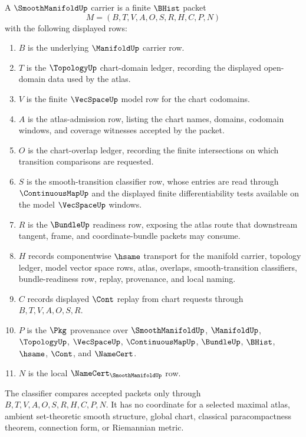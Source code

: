 \begin{definition}
\label{def:smoothmanifold-carrier}
A $\SmoothManifoldUp$ carrier is a finite $\BHist$ packet
$$
M=(B,T,V,A,O,S,R,H,C,P,N)
$$
with the following displayed rows:
\begin{enumerate}
\item $B$ is the underlying $\ManifoldUp$ carrier row.
\item $T$ is the $\TopologyUp$ chart-domain ledger, recording the displayed open-domain data used by the atlas.
\item $V$ is the finite $\VecSpaceUp$ model row for the chart codomains.
\item $A$ is the atlas-admission row, listing the chart names, domains, codomain windows, and coverage witnesses accepted by the packet.
\item $O$ is the chart-overlap ledger, recording the finite intersections on which transition comparisons are requested.
\item $S$ is the smooth-transition classifier row, whose entries are read through $\ContinuousMapUp$ and the displayed finite differentiability tests available on the model $\VecSpaceUp$ windows.
\item $R$ is the $\BundleUp$ readiness row, exposing the atlas route that downstream tangent, frame, and coordinate-bundle packets may consume.
\item $H$ records componentwise $\hsame$ transport for the manifold carrier, topology ledger, model vector space rows, atlas, overlaps, smooth-transition classifiers, bundle-readiness row, replay, provenance, and local naming.
\item $C$ records displayed $\Cont$ replay from chart requests through $B,T,V,A,O,S,R$.
\item $P$ is the $\Pkg$ provenance over $\SmoothManifoldUp$, $\ManifoldUp$, $\TopologyUp$, $\VecSpaceUp$, $\ContinuousMapUp$, $\BundleUp$, $\BHist$, $\hsame$, $\Cont$, and $\NameCert$.
\item $N$ is the local $\NameCert_{\SmoothManifoldUp}$ row.
\end{enumerate}
The classifier compares accepted packets only through $B,T,V,A,O,S,R,H,C,P,N$. It has no coordinate for a selected maximal atlas, ambient set-theoretic smooth structure, global chart, classical paracompactness theorem, connection form, or Riemannian metric.
\end{definition}

